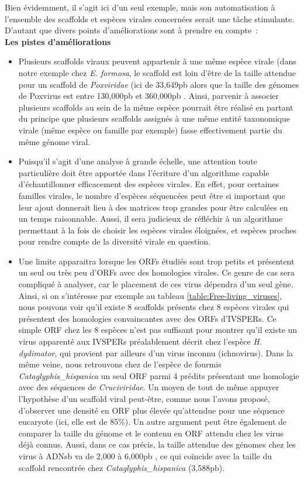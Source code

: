 Bien évidemment, il s'agit ici d'un seul exemple, mais son automatisation à l'ensemble des scaffolds et espèces virales concernées serait une tâche stimulante. D'autant que divers points d'améliorations sont à prendre en compte :\\

\textbf{Les pistes d'améliorations}

\begin{itemize}
    \item Plusieurs scaffolds viraux peuvent appartenir à une même espèce virale (dans notre exemple chez \textit{E. formosa}, le scaffold est loin d'être de la taille attendue pour un scaffold de \textit{Poxviridae} (ici de 33,649pb alors que la taille des génomes de Poxvirus est entre 130,000pb et 360,000pb \citep{hughes_evolutionary_2010}. Ainsi, parvenir à associer plusieurs scaffolds au sein de la même espèce pourrait être réalisé en partant du principe que plusieurs scaffolds assignés à une même entité taxonomique virale (même espèce ou famille par exemple) fasse effectivement partie du même génome viral.

    \item Puisqu'il s'agit d'une analyse à grande échelle, une attention toute particulière doit être apportée dans l'écriture d'un algorithme capable d'échantillonner efficacement des espèces virales. En effet, pour certaines familles virales, le nombre d'espèces séquencées peut être si important que leur ajout donnerait lieu à des matrices trop grandes pour être calculées en un temps raisonnable. Aussi, il sera judicieux de réfléchir à un algorithme permettant à la fois de choisir les espèces virales éloignées, et espèces proches pour rendre compte de la  diversité virale en question. 
    
    \item Une limite apparaitra  lorsque les ORFs étudiés sont trop petits et présentent un seul ou très peu d'ORFs avec des homologies virales. Ce genre de cas sera compliqué à analyser, car le placement de ces virus dépendra d'un seul gène. Ainsi, si on s'intéresse par exemple au tableau \ref{table:Free-living_viruses}, nous pouvons voir qu'il existe 8 scaffolds présents chez 8 espèces virales qui présentent des homologies convaincantes avec des ORFs d'IVSPERs. Ce simple ORF chez les 8 espèces n'est pas suffisant pour montrer qu'il existe un virus apparenté aux IVSPERs préalablement décrit chez l'espèce \textit{H. dydimator}, qui provient par ailleurs d'un virus inconnu (ichnovirus). Dans la même veine, nous retrouvons chez de l'espèce de fourmis \textit{Cataglyphis\_hispanica} un seul ORF parmi 4 prédits présentant une homologie avec des séquences de \textit{Cruciviridae}. Un moyen de tout de même appuyer l'hypothèse d'un scaffold viral peut-être, comme nous l'avons proposé, d'observer une densité en ORF plus élevée qu'attendue pour une séquence eucaryote (ici, elle est de 85\%). Un autre argument peut être également de comparer la taille du génome et le contenu en ORF attendu chez les virus déjà connus. Aussi, dans ce cas précis, la taille attendue des génomes chez les virus à ADNsb va de 2,000 à 6,000pb \citep{campillo-balderas_viral_2015}, ce qui coïncide avec la taille du scaffold rencontrée chez \textit{Cataglyphis\_hispanica} (3,588pb). 
  

\end{itemize}
